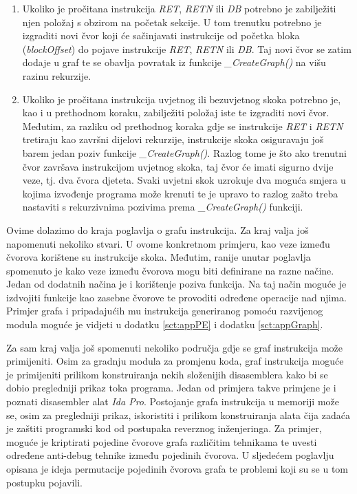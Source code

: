 \documentclass[times, utf8, diplomski, numeric]{fer}
\begin{document}
\begin{enumerate}
\begin{enumerate}
\item Ukoliko je pročitana instrukcija \emph{RET}, \emph{RETN} ili \emph{DB} potrebno je zabilježiti njen položaj s obzirom na početak sekcije. U tom trenutku potrebno je izgraditi novi čvor koji će sačinjavati instrukcije od početka bloka (\emph{blockOffset}) do pojave instrukcije \emph{RET}, \emph{RETN} ili \emph{DB}. Taj novi čvor se zatim dodaje u graf te se obavlja povratak iz funkcije \emph{\_CreateGraph()} na višu razinu rekurzije.
\item Ukoliko je pročitana instrukcija uvjetnog ili bezuvjetnog skoka potrebno je, kao i u prethodnom koraku, zabilježiti položaj iste te izgraditi novi čvor. Međutim, za razliku od prethodnog koraka gdje se instrukcije \emph{RET} i \emph{RETN} tretiraju kao završni dijelovi rekurzije, instrukcije skoka osiguravaju još barem jedan poziv funkcije \emph{\_CreateGraph()}. Razlog tome je što ako trenutni čvor završava instrukcijom uvjetnog skoka, taj čvor će imati sigurno dvije veze, tj. dva čvora djeteta. Svaki uvjetni skok uzrokuje dva moguća smjera u kojima izvođenje programa može krenuti te je upravo to razlog zašto treba nastaviti s rekurzivnima pozivima prema \emph{\_CreateGraph()} funkciji.
\end{enumerate}
\end{enumerate} 
Ovime dolazimo do kraja poglavlja o grafu instrukcija. Za kraj valja još napomenuti nekoliko stvari. U ovome konkretnom primjeru, kao veze između čvorova korištene su instrukcije skoka. Međutim, ranije unutar poglavlja spomenuto je kako veze između čvorova mogu biti definirane na razne načine. Jedan od dodatnih načina je i korištenje poziva funkcija. Na taj način moguće je izdvojiti funkcije kao zasebne čvorove te provoditi određene operacije nad njima. Primjer grafa i pripadajućih mu instrukcija generiranog pomoću razvijenog modula moguće je vidjeti u dodatku \ref{sct:appPE} i dodatku \ref{sct:appGraph}.

Za sam kraj valja još spomenuti nekoliko područja gdje se graf instrukcija može primijeniti. Osim za gradnju modula za promjenu koda, graf instrukcija moguće je primijeniti prilikom konstruiranja nekih složenijih disasemblera kako bi se dobio pregledniji prikaz toka programa. Jedan od primjera takve primjene je i poznati disasembler alat \emph{Ida Pro}\citep{ida}. Postojanje grafa instrukcija u memoriji može se, osim za pregledniji prikaz, iskoristiti i prilikom konstruiranja alata čija zadaća je zaštiti programski kod od postupaka reverznog inženjeringa. Za primjer, moguće je kriptirati pojedine čvorove grafa različitim tehnikama te uvesti određene anti-debug tehnike između pojedinih čvorova. U sljedećem poglavlju opisana je ideja permutacije pojedinih čvorova grafa te problemi koji su se u tom postupku pojavili.
\end{document}
